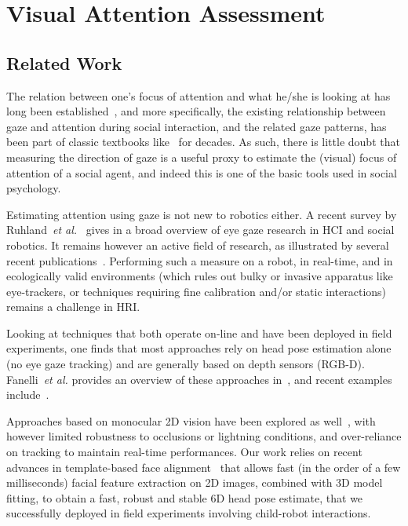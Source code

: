 \documentclass{sig-alternate}
\newcommand{\etal}{\textit{et al.}\xspace}
\begin{document}

\section{Visual Attention Assessment}
\label{sec:vfoa}

\subsection{Related Work}

The relation between one's focus of attention and what he/she is looking at has
long been established~\cite{yarbus1967eye,barber1976perception}, and more
specifically, the existing relationship between gaze and attention during social
interaction, and the related gaze patterns, has been part of classic textbooks
like~\cite{argyle1969social} for decades. As such, there is little doubt that
measuring the direction of gaze is a useful proxy to estimate the (visual) focus
of attention of a social agent, and indeed this is one of the basic tools used
in social psychology.

Estimating attention using gaze is not new to robotics either. A recent survey
by Ruhland~\etal~\cite{ruhland2015review} gives in a broad overview of eye gaze
research in HCI and social robotics. It remains however an active field of
research, as illustrated by several recent
publications~\cite{baxter2014tracking,anzalone,kennedy2015head}.  Performing
such a measure on a robot, in real-time, and in ecologically valid environments
(which rules out bulky or invasive apparatus like eye-trackers, or techniques
requiring fine calibration and/or static interactions) remains a challenge in
HRI.

Looking at techniques that both operate on-line and have been deployed in field
experiments, one finds that most approaches rely on head pose estimation alone
(no eye gaze tracking) and are generally based on depth sensors (RGB-D).
Fanelli~\etal provides an overview of these approaches
in~\cite{fanelli2012real}, and recent examples include~\cite{baxter2014tracking,
anzalone}.

Approaches based on monocular 2D vision have been explored as
well~\cite{peters2010investigating}, with however limited robustness to
occlusions or lightning conditions, and over-reliance on tracking to maintain
real-time performances.  Our work relies on recent advances in template-based
face alignment~\cite{kazemi2014one} that allows fast (in the order of a few
milliseconds) facial feature extraction on 2D images, combined with 3D model
fitting, to obtain a fast, robust and stable 6D head pose estimate, that we
successfully deployed in field experiments involving child-robot interactions.
\end{document}
